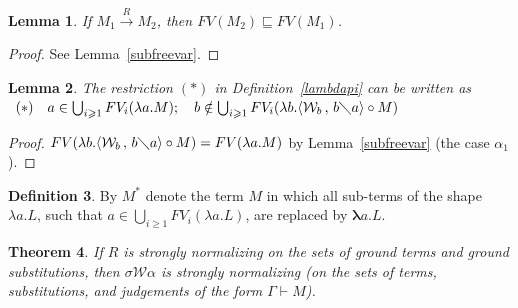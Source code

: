 \documentclass[11pt]{amsart}
\theoremstyle{plain}
\newtheorem{theorem}{Theorem}[section]
\newtheorem{lemma}[theorem]{Lemma}
\theoremstyle{definition}
\newtheorem{definition}[theorem]{Definition}
\theoremstyle{remark}
\numberwithin{equation}{section}
\newcommand{\ci}{\circ}
\newcommand{\mi}{\,,\,}
\newcommand{\is}{\diagdown}
\newcommand{\arrow}{\rightarrow}
\newcommand{\x}{a}
\newcommand{\y}{b}
\renewcommand{\pi}{\mathcal{W}}
\begin{document}
\begin{lemma}If $M_1\overset{R}{\arrow}M_2$, then $FV(M_2)\sqsubseteq
FV(M_1)$.
\end{lemma}
\begin{proof}See Lemma~\ref{subfreevar}.
\end{proof}
\begin{lemma}\label{restriction}The restriction $(*)$ in Definition~\ref{lambdapi} can be
written as\\
$
\begin{array}{ll}
(*) & \x \in \bigcup_{i\geqslant 1}FV_i(\lambda \x.M);\quad
\y\notin \bigcup_{i\geqslant 1}FV_i(\lambda \y.\langle\pi_{\y}\mi
\y\is \x\rangle\ci M
 )\\
 \end{array}
$
\end{lemma}
\begin{proof}$FV(\lambda \y.\langle\pi_{\y}\mi \y\is
\x\rangle\ci M )=FV(\lambda \x.M) $ by Lemma~\ref{subfreevar} (the
case $\alpha_1$).
\end{proof}
\begin{definition}By $M^*$ denote the term $M$ in which all sub-terms of
the shape $\lambda \x.L$, such that $\x\in \bigcup_{i\geqslant
1}FV_i(\lambda \x.L)$, are replaced  by $\boldsymbol{\lambda}
\x.L$.
\end{definition}
\begin{theorem}If $R$ is strongly normalizing on the sets of ground terms and ground substitutions, then $\sigma\pi\alpha$ is strongly normalizing (on the sets of terms, substitutions, and judgements of
the form $\Gamma\vdash M$).
\end{theorem}
\end{document}
